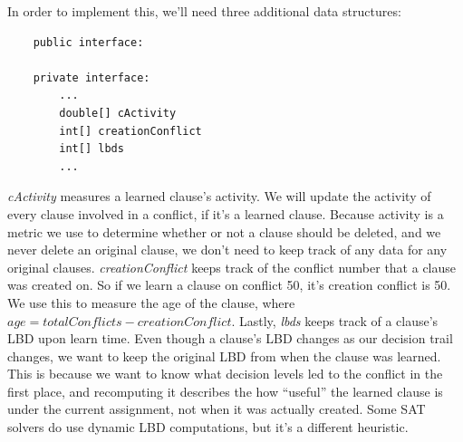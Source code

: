 \documentclass[../main.tex]{subfiles}
\begin{document}
In order to implement this, we'll need three additional data structures:
\begin{lstlisting}
    public interface:

    private interface:
        ...
        double[] cActivity
        int[] creationConflict
        int[] lbds
        ...
\end{lstlisting}
\noindent
\textit{cActivity} measures a learned clause's activity. We will update the activity of 
every clause involved in a conflict, if it's a learned clause. Because activity is a metric 
we use to determine whether or not a clause should be deleted, and we never delete an original 
clause, we don't need to keep track of any data for any original clauses. 
\textit{creationConflict} keeps track of the conflict number that a clause was created on.
So if we learn a clause on conflict 50, it's creation conflict is 50. We use this to measure the 
age of the clause, where $age = totalConflicts - creationConflict$.
Lastly, \textit{lbds} keeps track of a clause's LBD upon learn time. Even though a clause's LBD 
changes as our decision trail changes, we want to keep the original LBD from when the clause was 
learned. This is because we want to know what decision levels led to the conflict in the first place, 
and recomputing it describes the how ``useful'' the learned clause is under the current assignment, 
not when it was actually created. Some SAT solvers do use dynamic LBD computations, but it's a 
different heuristic.
\end{document}
